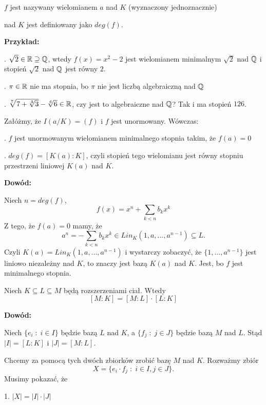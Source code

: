 \indent \point $f$ jest nazywany wielomianem  $a$ nad $K$ (wyznaczony jednoznacznie)

\indent \point {} nad $K$ jest definiowany jako $deg(f)$.
\medskip

\textbf{Przykład:}

. $\sqrt{2}\in\mathbb{R}\supseteq\mathbb{Q}$, wtedy $f(x)=x^2-2$ jest wielomianem minimalnym $\sqrt2$ nad $\mathbb{Q}$ i stopień $\sqrt{2}$ nad $\mathbb{Q}$ jest równy $2$.

. $\pi\in\mathbb{R}$ nie ma stopnia, bo $\pi$ nie jest liczbą algebraiczną nad $\mathbb{Q}$

. $\sqrt[7]{7+\sqrt[3]{3}}-\sqrt[6]{6}\in\mathbb{R}$, czy jest to algebraiczne nad $\mathbb{Q}$? Tak i ma stopień $126$.

\begin{uwaga}[$I(a/K)=(f)\implies deg(f)=\begin{bmatrix}K(a):K\end{bmatrix}$]
    Załóżmy, że $I(a/K)=(f)$ i $f$ jest unormowany. Wówczas:

    . $f$ jest unormowanym wielomianem minimalnego stopnia takim, że $f(a)=0$

    . $deg(f)=[K(a):K]$, czyli stopień tego wielomianu jest równy stopniu przestrzeni liniowej $K(a)$ nad $K$.
\end{uwaga}

\textbf{Dowód:}

Niech $n=deg(f)$, 
$$f(x)=x^n+\sum\limits_{k<n}b_kx^k$$
Z tego, że $f(a)=0$ mamy, że 
$$a^n=-\sum\limits_{k<n}b_kx^k\in Lin_K(1,a,...,a^{n-1})\subseteq L.$$
Czyli $K(a)=Lin_K(1,a,...,a^{n-1})$ i wystarczy zobaczyć, że $\{1,..., a^{n-1}\}$ jest liniowo niezależny nad $K$, to znaczy jest bazą $K(a)$ nad $K$. Jest, bo $f$ jest minimalnego stopnia.

\begin{fakt}[$dim_K(M)=dim_L(M)\cdot dim_K(L)$]\label{fakt:4:5}
    Niech $K\subseteq L\subseteq M$ będą rozszerzeniami ciał. Wtedy 
    $$[M:K]=[M:L]\cdot [L:K]$$
\end{fakt}

\textbf{Dowód:}

Niech $\{e_i\;:\;i\in I\}$ będzie bazą $L$ nad $K$, a $\{f_j\;:\;j\in J\}$ będzie bazą $M$ nad $L$. Stąd $|I|=[L:K]$ i $|J|=[M:L]$.

Chcemy za pomocą tych dwóch zbiorków zrobić bazę $M$ nad $K$. Rozważmy zbiór
$$X=\{e_i\cdot f_j\;:\;i\in I,j\in J\}.$$
Musimy pokazać, że 

1. $|X|=|I|\cdot|J|$

